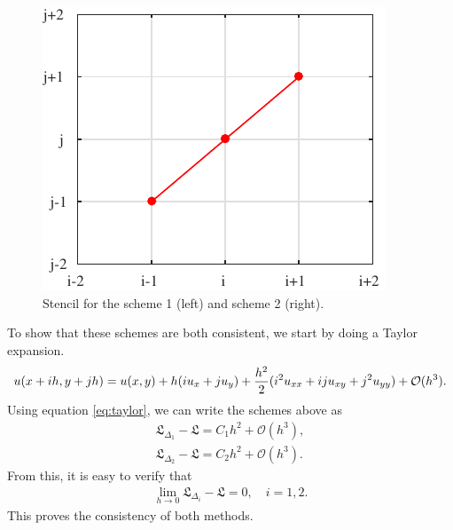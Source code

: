 \documentclass[10pt,a4paper,twoside, french]{article}
\numberwithin{equation}{section}
\numberwithin{figure}{section}
\numberwithin{table}{section}
\begin{document}
\begin{enumerate}
\begin{enumerate}[a.]
\begin{figure}[h]
\hspace{.8cm}
\includegraphics[scale=.8]{fig/scheme2}
\caption{Stencil for the scheme 1 (left) and scheme 2 (right).}
\end{figure}
To show that these schemes are both consistent, we start by doing a Taylor expansion.
\begin{align}
u(x+ih,y+jh) = u(x,y) +h(iu_x+ju_y)+\dfrac{h^2}{2}(i^2u_{xx}+iju_{xy}+j^2u_{yy})+{\cal{O}}(h^3).
\label{eq:taylor}
\end{align}
Using equation \eqref{eq:taylor}, we can write the schemes above as
\begin{align}
\mathfrak{L}_{\Delta_1}-\mathfrak{L} =  C_1h^2 + \mathcal{O}(h^3),\\
\mathfrak{L}_{\Delta_2}-\mathfrak{L} =  C_2h^2 + \mathcal{O}(h^3).
\end{align}
From this, it is easy to verify that 
\begin{align*}
\lim_{h\to0}\mathfrak{L}_{\Delta_i}-\mathfrak{L} = 0, \quad i=1,2.
\end{align*}
This proves the consistency of both methods.



\end{enumerate}
\end{enumerate}
\end{document}
